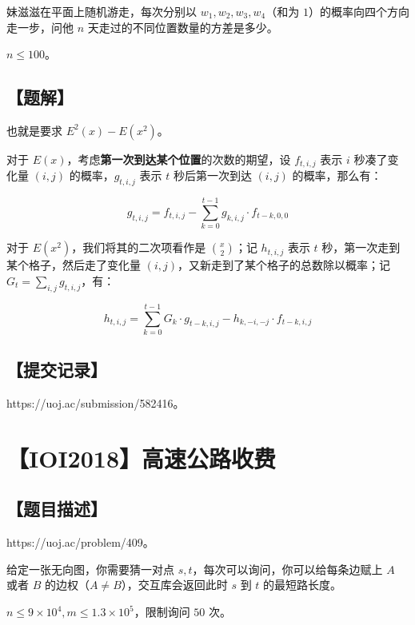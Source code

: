 \documentclass[UTF8,12pt,a4paper]{ctexart}
\begin{document}
	妹滋滋在平面上随机游走，每次分别以 $w_1,w_2,w_3,w_4$（和为 $1$）的概率向四个方向走一步，问他 $n$ 天走过的不同位置数量的方差是多少。
	
	$n\le 100$。
	
	\subsection*{【题解】}
	
	也就是要求 $E^2\left(x\right)-E\left(x^2\right)$。
	
	对于 $E(x)$，考虑\textbf{第一次到达某个位置}的次数的期望，设 $f_{t,i,j}$ 表示 $i$ 秒凑了变化量 $(i,j)$ 的概率，$g_{t,i,j}$ 表示 $t$ 秒后第一次到达 $(i,j)$ 的概率，那么有：
	
	$$
	g_{t,i,j}=f_{t,i,j}-\sum_{k=0}^{t-1} g_{k,i,j}\cdot f_{t-k,0,0}
	$$
	
	对于 $E\left(x^2\right)$，我们将其的二次项看作是 $\binom{x}{2}$；记 $h_{t,i,j}$ 表示 $t$ 秒，第一次走到某个格子，然后走了变化量 $(i,j)$，又新走到了某个格子的总数除以概率；记 $G_{t}=\sum_{i,j}g_{t,i,j}$，有：
	
	$$
	h_{t,i,j}=\sum_{k=0}^{t-1} G_{k}\cdot g_{t-k,i,j} - h_{k,-i,-j}\cdot f_{t-k,i,j}
	$$
	
	\subsection*{【提交记录】}
	
	https://uoj.ac/submission/582416。
	
	
	\section*{【IOI2018】高速公路收费}
	
	\subsection*{【题目描述】}
	
	https://uoj.ac/problem/409。
	
	给定一张无向图，你需要猜一对点 $s,t$，每次可以询问，你可以给每条边赋上 $A$ 或者 $B$ 的边权（$A\neq B$），交互库会返回此时 $s$ 到 $t$ 的最短路长度。
	
	$n\le 9\times 10^4,m\le 1.3\times 10^5$，限制询问 $50$ 次。
	
\end{document}
